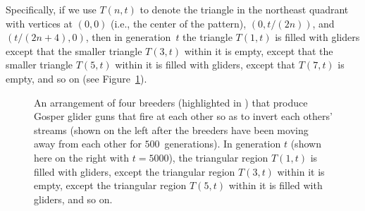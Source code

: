 \begin{itemize}
	Specifically, if we use $T(n,t)$ to denote the triangle in the northeast quadrant with vertices at $(0,0)$ (i.e., the center of the pattern), $(0, t/(2n))$, and $(t/(2n+4), 0)$, then in generation~$t$ the triangle $T(1,t)$ is filled with gliders except that the smaller triangle $T(3,t)$ within it is empty, except that the smaller triangle $T(5,t)$ within it is filled with gliders, except that $T(7,t)$ is empty, and so on (see Figure~\ref{fig:life_computes_pi}).\bigskip
	
	\begin{figure}[!htb]
		\centering
		\caption{An arrangement of four breeders (highlighted in ) that produce Gosper glider guns that fire at each other so as to invert each others' streams (shown on the left after the breeders have been moving away from each other for $500$~generations). In generation $t$ (shown here on the right with $t = 5000$), the  triangular region $T(1,t)$ is filled with gliders, except the  triangular region $T(3,t)$ within it is empty, except the  triangular region $T(5,t)$ within it is filled with gliders, and so on.}\label{fig:life_computes_pi}
	\end{figure}
	

\end{itemize}
